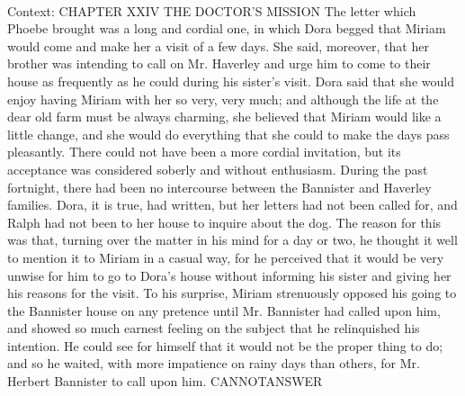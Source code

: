 \documentclass[11pt,a4paper, onecolumn]{article}
\begin{document}
\\ Context: CHAPTER XXIV THE DOCTOR'S MISSION The letter which Phoebe brought was a long and cordial one, in which Dora begged that Miriam would come and make her a visit of a few days. She said, moreover, that her brother was intending to call on Mr. Haverley and urge him to come to their house as frequently as he could during his sister's visit. Dora said that she would enjoy having Miriam with her so very, very much; and although the life at the dear old farm must be always charming, she believed that Miriam would like a little change, and she would do everything that she could to make the days pass pleasantly. There could not have been a more cordial invitation, but its acceptance was considered soberly and without enthusiasm. During the past fortnight, there had been no intercourse between the Bannister and Haverley families. Dora, it is true, had written, but her letters had not been called for, and Ralph had not been to her house to inquire about the dog. The reason for this was that, turning over the matter in his mind for a day or two, he thought it well to mention it to Miriam in a casual way, for he perceived that it would be very unwise for him to go to Dora's house without informing his sister and giving her his reasons for the visit. To his surprise, Miriam strenuously opposed his going to the Bannister house on any pretence until Mr. Bannister had called upon him, and showed so much earnest feeling on the subject that he relinquished his intention. He could see for himself that it would not be the proper thing to do; and so he waited, with more impatience on rainy days than others, for Mr. Herbert Bannister to call upon him. CANNOTANSWER
\end{document}
